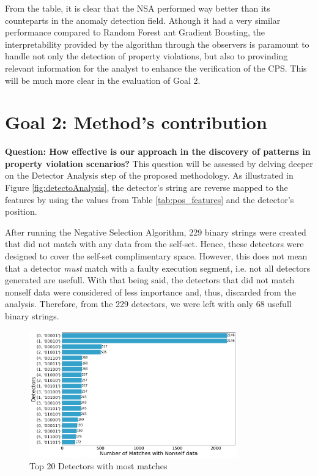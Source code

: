 From the table, it is clear that the NSA performed way better than its counteparts in the anomaly detection field. Athough it had a very similar performance compared to Random Forest ant Gradient Boosting, the interpretability provided by the algorithm through the observers is paramount to handle not only the detection of property violations, but also to provinding relevant information for the analyst to enhance the verification of the CPS. This will be much more clear in the evaluation of Goal 2.

\section{Goal 2: Method's contribution}
\textbf{Question: How effective is our approach in the discovery of patterns in property violation scenarios?} This question will be assessed by delving deeper on the Detector Analysis step of the proposed methodology. As illustrated in Figure \ref{fig:detectoAnalysis}, the detector's string are reverse mapped to the features by using the values from Table \ref{tab:pos_features} and the detector's position. 

After running the Negative Selection Algorithm, 229 binary strings were created that did not match with any data from the self-set. Hence, these detectors were designed to cover the self-set complimentary space. However, this does not mean that a detector \textit{must} match with a faulty execution segment, i.e. not all detectors generated are usefull. With that being said, the detectors that did not match nonself data were considered of less importance and, thus, discarded from the analysis. Therefore, from the 229 detectors, we were left with only 68 usefull binary strings. 

\begin{figure}[]
	\centering
	\includegraphics[width=0.8\textwidth, keepaspectratio]{img/matches_by_detector_rdz.png}
	\caption{Top 20 Detectors with most matches}
	\label{fig:ev_det_match}
\end{figure}

